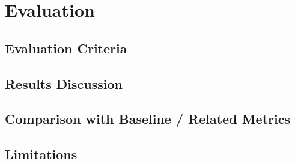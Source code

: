 \chapter{Evaluation}
\label{chap:evaluation}


\section{Evaluation Criteria}

\section{Results Discussion}

\section{Comparison with Baseline / Related Metrics}

\section{Limitations}

